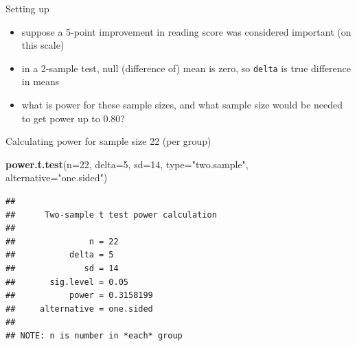 \documentclass[ignorenonframetext,]{beamer}
\newenvironment{Shaded}{\begin{snugshade}}{\end{snugshade}}
\newcommand{\DataTypeTok}[1]{\textcolor[rgb]{0.13,0.29,0.53}{#1}}
\newcommand{\DecValTok}[1]{\textcolor[rgb]{0.00,0.00,0.81}{#1}}
\newcommand{\KeywordTok}[1]{\textcolor[rgb]{0.13,0.29,0.53}{\textbf{#1}}}
\newcommand{\NormalTok}[1]{#1}
\newcommand{\StringTok}[1]{\textcolor[rgb]{0.31,0.60,0.02}{#1}}
\providecommand{\tightlist}{%
  \setlength{\itemsep}{0pt}\setlength{\parskip}{0pt}}
\begin{document}
\begin{frame}[fragile]{Setting up}
\protect\hypertarget{setting-up}{}

\begin{itemize}
\tightlist
\item
  suppose a 5-point improvement in reading score was considered
  important (on this scale)
\item
  in a 2-sample test, null (difference of) mean is zero, so
  \texttt{delta} is true difference in means
\item
  what is power for these sample sizes, and what sample size would be
  needed to get power up to 0.80?
\end{itemize}

\end{frame}

\begin{frame}[fragile]{Calculating power for sample size 22 (per group)}
\protect\hypertarget{calculating-power-for-sample-size-22-per-group}{}

\begin{Shaded}
\begin{Highlighting}[]
\KeywordTok{power.t.test}\NormalTok{(}\DataTypeTok{n=}\DecValTok{22}\NormalTok{, }\DataTypeTok{delta=}\DecValTok{5}\NormalTok{, }\DataTypeTok{sd=}\DecValTok{14}\NormalTok{, }\DataTypeTok{type=}\StringTok{"two.sample"}\NormalTok{, }
             \DataTypeTok{alternative=}\StringTok{"one.sided"}\NormalTok{)}
\end{Highlighting}
\end{Shaded}

\begin{verbatim}
## 
##      Two-sample t test power calculation 
## 
##               n = 22
##           delta = 5
##              sd = 14
##       sig.level = 0.05
##           power = 0.3158199
##     alternative = one.sided
## 
## NOTE: n is number in *each* group
\end{verbatim}

\end{frame}
\end{document}
